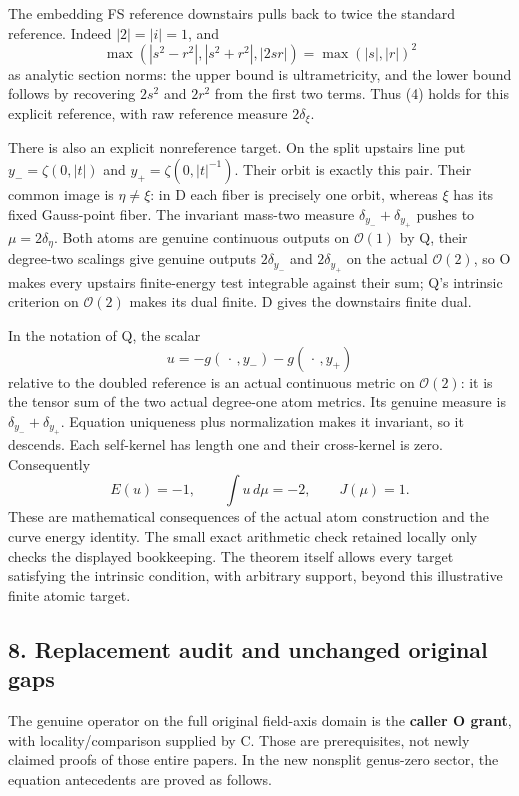 \documentclass[
  11pt,
]{article}
\begin{document}
The embedding FS reference downstairs pulls back to twice the standard
reference. Indeed \(|2|=|i|=1\), and \[
\max(|s^2-r^2|,|s^2+r^2|,|2sr|)=\max(|s|,|r|)^2
\] as analytic section norms: the upper bound is ultrametricity, and the
lower bound follows by recovering \(2s^2\) and \(2r^2\) from the first
two terms. Thus (4) holds for this explicit reference, with raw
reference measure \(2\delta_\xi\).

There is also an explicit nonreference target. On the split upstairs
line put \(y_-=\zeta(0,|t|)\) and \(y_+=\zeta(0,|t|^{-1})\). Their orbit
is exactly this pair. Their common image is \(\eta\ne\xi\): in D each
fiber is precisely one orbit, whereas \(\xi\) has its fixed Gauss-point
fiber. The invariant mass-two measure \(\delta_{y_-}+\delta_{y_+}\)
pushes to \(\mu=2\delta_\eta\). Both atoms are genuine continuous
outputs on \(\mathcal O(1)\) by Q, their degree-two scalings give
genuine outputs \(2\delta_{y_-}\) and \(2\delta_{y_+}\) on the actual
\(\mathcal O(2)\), so O makes every upstairs finite-energy test
integrable against their sum; Q's intrinsic criterion on
\(\mathcal O(2)\) makes its dual finite. D gives the downstairs finite
dual.

In the notation of Q, the scalar \[
u=-g(\,\cdot\,,y_-)-g(\,\cdot\,,y_+)
\] relative to the doubled reference is an actual continuous metric on
\(\mathcal O(2)\): it is the tensor sum of the two actual degree-one
atom metrics. Its genuine measure is \(\delta_{y_-}+\delta_{y_+}\).
Equation uniqueness plus normalization makes it invariant, so it
descends. Each self-kernel has length one and their cross-kernel is
zero. Consequently \[
E(u)=-1,\qquad \int u\,d\mu=-2,\qquad J(\mu)=1.
\tag{16}
\] These are mathematical consequences of the actual atom construction
and the curve energy identity. The small exact arithmetic check retained
locally only checks the displayed bookkeeping. The theorem itself allows
every target satisfying the intrinsic condition, with arbitrary support,
beyond this illustrative finite atomic target.

\subsection{8. Replacement audit and unchanged original
gaps}\label{replacement-audit-and-unchanged-original-gaps}

The genuine operator on the full original field-axis domain is the
\textbf{caller O grant}, with locality/comparison supplied by C. Those
are prerequisites, not newly claimed proofs of those entire papers. In
the new nonsplit genus-zero sector, the equation antecedents are proved
as follows.
\end{document}
